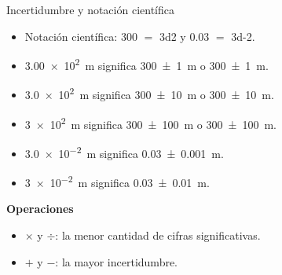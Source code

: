 \documentclass[9pt, aspectratio=169]{beamer}
\begin{document}
\begin{frame}{Incertidumbre y notación científica}
\Large
\begin{itemize}
    \item Notación científica: \num{300} $=$ \num{3d2} y \num{0.03} $=$ \num{3d-2}.
    \item \qty{3.00e2}{m} significa \qty[separate-uncertainty=true]{300 \pm 1}{m} o \qty{300 \pm 1}{m}. 
    \item \qty{3.0e2}{m} significa \qty[separate-uncertainty=true]{300 \pm 10}{m} o \qty{300 \pm 10}{m}.
    \item \qty{3e2}{m} significa \qty[separate-uncertainty=true]{300 \pm 100}{m} o \qty{300 \pm 100}{m}.
    \item \qty{3.0e-2}{m} significa \qty[separate-uncertainty=true]{0.03 \pm 0.001}{m}.
    \item \qty{3e-2}{m} significa \qty[separate-uncertainty=true]{0.03 \pm 0.01}{m}.
\end{itemize}

\vspace{0.2cm}
{\bf Operaciones}
\begin{itemize}
 \item $\times$ y $\div$: la menor cantidad de cifras significativas.
 \item $+$ y $-$: la mayor incertidumbre.
\end{itemize}
\end{frame}
\end{document}
